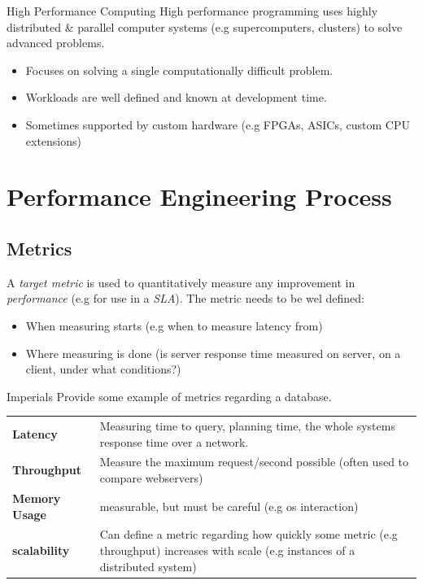 \begin{definitionbox}{High Performance Computing}
    High performance programming uses highly distributed \& parallel computer systems (e.g supercomputers, clusters) to solve advanced problems.
    \begin{itemize}
        \item Focuses on solving a single computationally difficult problem.
        \item Workloads are well defined and known at development time.
        \item Sometimes supported by custom hardware (e.g FPGAs, ASICs, custom CPU extensions)
    \end{itemize}
\end{definitionbox}

\section{Performance Engineering Process}
\subsection{Metrics}
A \textit{target metric} is used to quantitatively measure any improvement in \textit{performance} (e.g for use in a \textit{SLA}).
The metric needs to be wel defined:
\begin{itemize}
    \item When measuring starts (e.g when to measure latency from)
    \item Where measuring is done (is server response time measured on server, on a client, under what conditions?)    
\end{itemize}

\begin{examplebox}{Imperials}
    Provide some example of metrics regarding a database.
    \tcblower
    \begin{center}
        \begin{tabular}{l p{}}
            \textbf{Latency} & Measuring time to query, planning time, the whole systems response time over a network. \\
            \textbf{Throughput} & Measure the maximum request/second possible (often used to compare webservers) \\
            \textbf{Memory Usage} & measurable, but must be careful (e.g os interaction) \\
            \textbf{scalability} & Can define a metric regarding how quickly some metric (e.g throughput) increases with scale (e.g instances of a distributed system) \\
        \end{tabular}
    \end{center}
\end{examplebox}    

